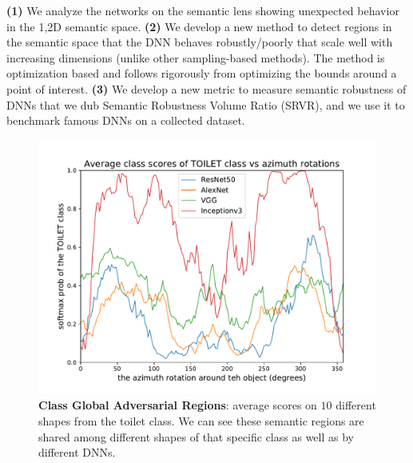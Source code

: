 \textbf{(1)} We analyze the networks on the semantic lens showing unexpected behavior in the 1,2D semantic space. \textbf{(2)} We develop a new method to detect regions in the semantic space that the DNN behaves robustly/poorly that scale well with increasing dimensions (unlike other sampling-based methods). The method is optimization based and follows rigorously from optimizing the bounds around a point of interest. \textbf{(3)} We develop a new metric to measure semantic robustness of DNNs that we dub Semantic Robustness Volume Ratio (SRVR), and we use it to benchmark famous DNNs on a collected dataset. 
\begin{figure}[t]
    \centering
  \includegraphics[width=\columnwidth]{images/average_azimuth_performance_TOILET.pdf}
  \vspace{-8pt}
  \caption{\small \textbf{Class Global Adversarial Regions}: average scores on $10$ different shapes from the toilet class. We can see these semantic regions are shared among different shapes of that specific class as well as by different DNNs.}
  \label{fig:global}
  \vspace{-4pt}
\end{figure}
